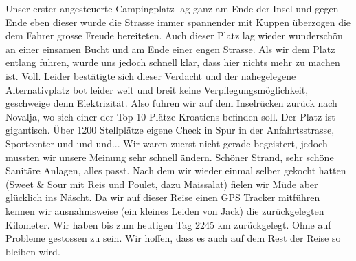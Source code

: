 Unser erster angesteuerte Campingplatz lag ganz am Ende der Insel und gegen Ende eben dieser wurde die Strasse immer spannender mit Kuppen überzogen die dem Fahrer grosse Freude bereiteten.
Auch dieser Platz lag wieder wunderschön an einer einsamen Bucht und am Ende einer engen Strasse.
Als wir dem Platz entlang fuhren, wurde uns jedoch schnell klar, dass hier nichts mehr zu machen ist.
Voll.
Leider bestätigte sich dieser Verdacht und der nahegelegene Alternativplatz bot leider weit und breit
keine Verpflegungsmöglichkeit, geschweige denn Elektrizität.
Also fuhren wir auf dem Inselrücken zurück nach Novalja, wo sich einer der Top 10 Plätze Kroatiens befinden soll.
Der Platz ist gigantisch.
Über 1200 Stellplätze eigene Check in Spur in der Anfahrtsstrasse, Sportcenter und und und... Wir waren zuerst nicht gerade begeistert, jedoch mussten wir unsere Meinung sehr schnell ändern.
Schöner Strand, sehr schöne Sanitäre Anlagen, alles passt.
Nach dem wir wieder einmal selber gekocht hatten
(Sweet \& Sour mit Reis und Poulet, dazu Maissalat) fielen wir Müde aber glücklich ins Näscht.
Da wir auf dieser Reise einen GPS Tracker mitführen kennen wir ausnahmsweise (ein kleines Leiden von Jack) die zurückgelegten Kilometer.
Wir haben bis zum heutigen Tag 2245 km zurückgelegt.
Ohne auf Probleme gestossen zu sein.
Wir hoffen, dass es auch auf dem Rest der Reise so bleiben wird.

